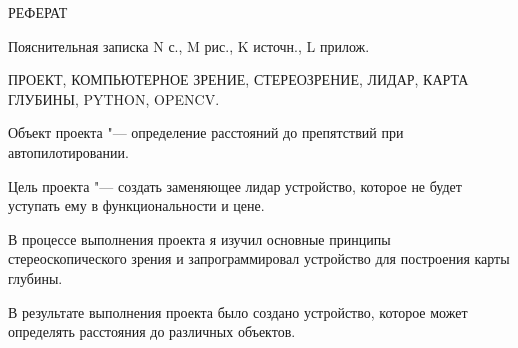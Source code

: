 \begin{center}
    РЕФЕРАТ
\end{center}

Пояснительная записка N с., M рис., K источн., L прилож.

\noindent ПРОЕКТ, КОМПЬЮТЕРНОЕ ЗРЕНИЕ, СТЕРЕОЗРЕНИЕ, ЛИДАР, КАРТА ГЛУБИНЫ, PYTHON, OPENCV.

Объект проекта "--- определение расстояний до препятствий при автопилотировании.

Цель проекта "--- создать заменяющее лидар устройство, которое не будет уступать ему в функциональности и цене.

В процессе выполнения проекта я изучил основные принципы стереоскопического зрения и запрограммировал устройство для построения карты глубины.

В результате выполнения проекта было создано устройство, которое может определять расстояния до различных объектов.
